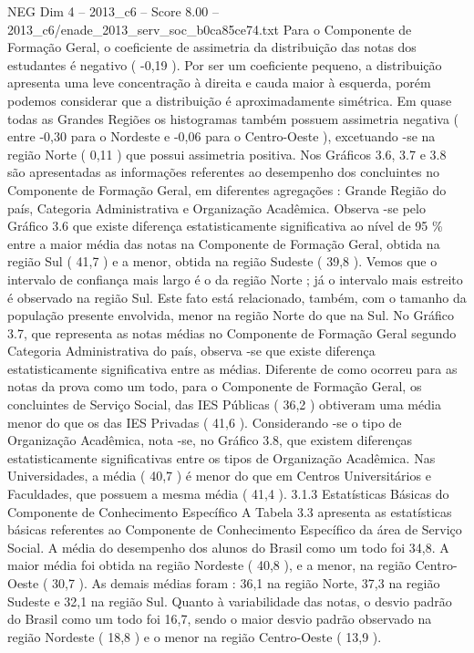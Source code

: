 \begin{textsample}{NEG Dim 4 – 2013\_c6 – Score 8.00 – 2013\_c6/enade\_2013\_serv\_soc\_b0ca85ce74.txt}
Para o Componente de Formação Geral, o coeficiente de assimetria da distribuição das notas dos estudantes é negativo ( -0,19 ).
Por ser um coeficiente pequeno, a distribuição apresenta uma leve concentração à direita e cauda maior à esquerda, porém podemos considerar que a distribuição é aproximadamente simétrica.
Em quase todas as Grandes Regiões os histogramas também possuem assimetria negativa ( entre -0,30 para o Nordeste e -0,06 para o Centro-Oeste ), excetuando -se na região Norte ( 0,11 ) que possui assimetria positiva.
Nos Gráficos 3.6, 3.7 e 3.8 são apresentadas as informações referentes ao desempenho dos concluintes no Componente de Formação Geral, em diferentes agregações : Grande Região do país, Categoria Administrativa e Organização Acadêmica.
Observa -se pelo Gráfico 3.6 que existe diferença estatisticamente significativa ao nível de 95 \% entre a maior média das notas na Componente de Formação Geral, obtida na região Sul ( 41,7 ) e a menor, obtida na região Sudeste ( 39,8 ).
Vemos que o intervalo de confiança mais largo é o da região Norte ; já o intervalo mais estreito é observado na região Sul.
Este fato está relacionado, também, com o tamanho da população presente envolvida, menor na região Norte do que na Sul.
No Gráfico 3.7, que representa as notas médias no Componente de Formação Geral segundo Categoria Administrativa do país, observa -se que existe diferença estatisticamente significativa entre as médias.
Diferente de como ocorreu para as notas da prova como um todo, para o Componente de Formação Geral, os concluintes de Serviço Social, das IES Públicas ( 36,2 ) obtiveram uma média menor do que os das IES Privadas ( 41,6 ).
Considerando -se o tipo de Organização Acadêmica, nota -se, no Gráfico 3.8, que existem diferenças estatisticamente significativas entre os tipos de Organização Acadêmica.
Nas Universidades, a média ( 40,7 ) é menor do que em Centros Universitários e Faculdades, que possuem a mesma média ( 41,4 ). 3.1.3 Estatísticas Básicas do Componente de Conhecimento Específico A Tabela 3.3 apresenta as estatísticas básicas referentes ao Componente de Conhecimento Específico da área de Serviço Social.
A média do desempenho dos alunos do Brasil como um todo foi 34,8.
A maior média foi obtida na região Nordeste ( 40,8 ), e a menor, na região Centro-Oeste ( 30,7 ).
As demais médias foram : 36,1 na região Norte, 37,3 na região Sudeste e 32,1 na região Sul.
Quanto à variabilidade das notas, o desvio padrão do Brasil como um todo foi 16,7, sendo o maior desvio padrão observado na região Nordeste ( 18,8 ) e o menor na região Centro-Oeste ( 13,9 ).

\end{textsample}
